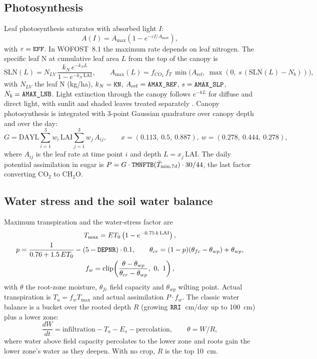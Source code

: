 \documentclass[11pt,a4paper]{article}
\newcommand{\code}[1]{\texttt{\detokenize{#1}}}
\begin{document}
\subsection{Photosynthesis}
Leaf photosynthesis saturates with absorbed light \(I\):
\begin{equation}
  A(I) = A_{\max}\left(1 - e^{-\varepsilon I / A_{\max}}\right),
\end{equation}
with \(\varepsilon = \code{EFF}\). In WOFOST~8.1 the maximum rate depends on leaf nitrogen. The specific leaf N at
cumulative leaf area \(L\) from the top of the canopy is
\begin{equation}
  \mathrm{SLN}(L) = N_{LV}\,\frac{k_N\, e^{-k_N L}}{1 - e^{-k_N\,\mathrm{LAI}}},
  \qquad
  A_{\max}(L) = f_{CO_2}\, f_T\,\min\!\big(A_{\mathrm{ref}},\ \max(0,\ s\,(\mathrm{SLN}(L) - N_b))\big),
\end{equation}
with \(N_{LV}\) the leaf N (kg/ha), \(k_N=\code{KN}\), \(A_{\mathrm{ref}}=\code{AMAX_REF}\), \(s=\code{AMAX_SLP}\),
\(N_b=\code{AMAX_LNB}\). Light extinction through the canopy follows \(e^{-k L}\) for diffuse and direct light,
with sunlit and shaded leaves treated separately \citep{spitters1986daily}. Canopy photosynthesis is integrated with
3-point Gaussian quadrature over canopy depth and over the day:
\begin{equation}
  G = \mathrm{DAYL} \sum_{i=1}^{3} w_i\, \mathrm{LAI}\sum_{j=1}^{3} w_j\, A_{ij},
  \qquad x = (0.113,\ 0.5,\ 0.887),\ w = (0.278,\ 0.444,\ 0.278),
\end{equation}
where \(A_{ij}\) is the leaf rate at time point \(i\) and depth \(L = x_j\,\mathrm{LAI}\). The daily potential
assimilation in sugar is \(P = G\cdot\code{TMNFTB}(\bar T_{\min,7d})\cdot 30/44\), the last factor converting CO\(_2\) to CH\(_2\)O.

\subsection{Water stress and the soil water balance}
Maximum transpiration and the water-stress factor are
\begin{gather}
  T_{\max} = ET_0\left(1 - e^{-0.75\,k\,\mathrm{LAI}}\right),\\
  p = \frac{1}{0.76 + 1.5\,ET_0} - (5 - \code{DEPNR})\cdot 0.1,\qquad
  \theta_{cr} = (1-p)(\theta_{fc} - \theta_{wp}) + \theta_{wp},\\
  f_w = \operatorname{clip}\!\left(\frac{\theta - \theta_{wp}}{\theta_{cr} - \theta_{wp}},\ 0,\ 1\right),
\end{gather}
with \(\theta\) the root-zone moisture, \(\theta_{fc}\) field capacity and \(\theta_{wp}\) wilting point. Actual
transpiration is \(T_a = f_w T_{\max}\) and actual assimilation \(P\cdot f_w\). The classic water balance is a bucket
over the rooted depth \(R\) (growing \(\code{RRI}\)~cm/day up to 100~cm) plus a lower zone:
\begin{equation}
  \frac{dW}{dt} = \text{infiltration} - T_a - E_s - \text{percolation},\qquad \theta = W/R,
\end{equation}
where water above field capacity percolates to the lower zone and roots gain the lower zone's water as they deepen.
With no crop, \(R\) is the top 10~cm.
\end{document}
